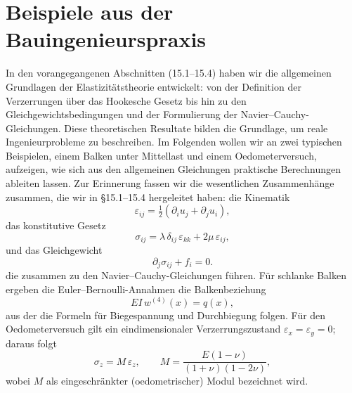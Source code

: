 %
%
%
%

%
\section{Beispiele aus der Bauingenieurspraxis}
\label{elastomechanik:section:teil4}
In den vorangegangenen Abschnitten (15.1–15.4) haben wir die allgemeinen Grundlagen der Elastizitätstheorie entwickelt: 
von der Definition der Verzerrungen über das Hookesche Gesetz bis hin zu den Gleichgewichtsbedingungen und der Formulierung der Navier--Cauchy-Gleichungen. 
Diese theoretischen Resultate bilden die Grundlage, um reale Ingenieurprobleme zu beschreiben. 
Im Folgenden wollen wir an zwei typischen Beispielen, einem Balken unter Mittellast und einem Oedometerversuch, aufzeigen, wie sich aus den allgemeinen Gleichungen praktische Berechnungen ableiten lassen. 
Zur Erinnerung fassen wir die wesentlichen Zusammenhänge zusammen, die wir in \S15.1–15.4 hergeleitet haben:
die Kinematik
\[
  \varepsilon_{ij} = \tfrac12(\partial_i u_j + \partial_j u_i),
\]
das konstitutive Gesetz
\[
  \sigma_{ij} = \lambda\, \delta_{ij}\,\varepsilon_{kk} + 2\mu\, \varepsilon_{ij},
\]
und das Gleichgewicht
\[
  \partial_j \sigma_{ij} + f_i = 0.
\]
die zusammen zu den Navier--Cauchy-Gleichungen führen.
Für schlanke Balken ergeben die Euler--Bernoulli-Annahmen die Balkenbeziehung
\[
  EI\, w^{(4)}(x) = q(x),
\]
aus der die Formeln für Biegespannung und Durchbiegung folgen.
Für den Oedometerversuch gilt ein eindimensionaler Verzerrungszustand
\(\varepsilon_x=\varepsilon_y=0\); daraus folgt
\[
  \sigma_z = M \,\varepsilon_z, \qquad
  M=\frac{E(1-\nu)}{(1+\nu)(1-2\nu)},
\]
wobei \(M\) als eingeschränkter (oedometrischer) Modul bezeichnet wird.
\]
